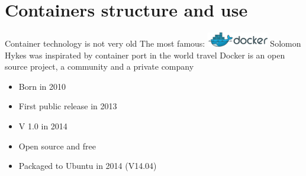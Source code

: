 \section{Containers structure and use}
\begin{frame}
Container technology is not very old \newline
\vspace{0.5cm}
The most famous: \includegraphics[width=0.2\textwidth]{images/docker_logo2.png} \newline
\vspace{0.5cm}
Solomon Hykes was inspirated by container port in the world travel \newline
\vspace{0.5cm}
 \newline
Docker is an open source project, a community and a private company 
\end{frame}

\begin{frame}
\begin{itemize}
\item Born in 2010
\item First public release in 2013
\item V 1.0 in 2014
\item Open source and free
\item Packaged to Ubuntu in 2014 (V14.04)
\end{itemize}
\end{frame}

